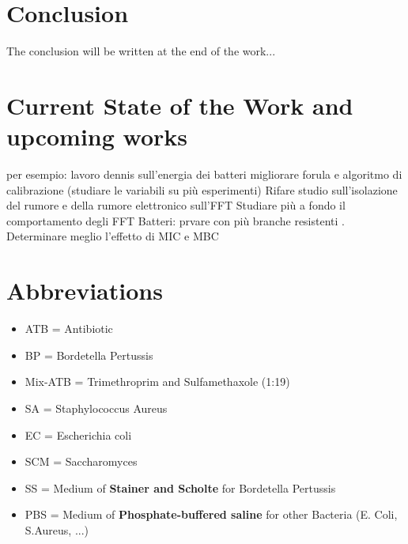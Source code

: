 \documentclass[11pt, a4paper]{article}
\begin{document}
\section{Conclusion}
The conclusion will be written at the end of the work...

\section{Current State of the Work and upcoming works}

per esempio: lavoro dennis sull'energia dei batteri
migliorare forula e algoritmo di calibrazione (studiare le variabili su più esperimenti)
Rifare studio sull'isolazione del rumore e della rumore elettronico sull'FFT
Studiare più a fondo il comportamento degli FFT 
Batteri: prvare con più branche resistenti . Determinare meglio l'effetto di MIC e MBC 
\section{Abbreviations}
\begin{itemize}
\item ATB = Antibiotic
\item BP = Bordetella Pertussis
\item Mix-ATB = Trimethroprim and Sulfamethaxole (1:19)
\item SA = Staphylococcus Aureus
\item EC = Escherichia coli
\item SCM = Saccharomyces
\item SS = Medium of \textbf{Stainer and Scholte} for Bordetella Pertussis 
\item PBS = Medium of \textbf{Phosphate-buffered saline} for other Bacteria (E. Coli, S.Aureus, ...)
\end{itemize}
\end{document}
